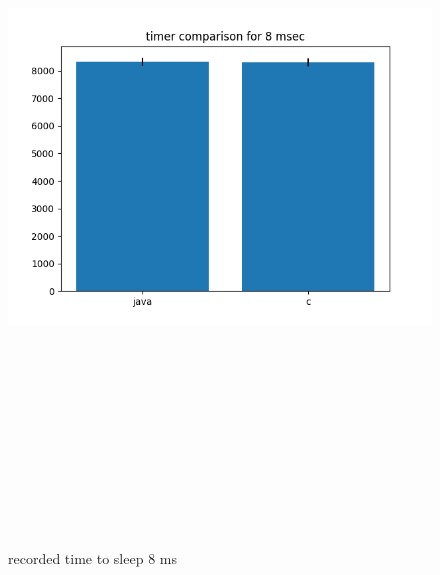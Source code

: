 \documentclass{article}
\begin{document}
    \begin{figure}[H]
    	\centering
    	\includegraphics[width=17cm,height=20cm,keepaspectratio]{AsyncMonitorCompares/sleep-timer_java-vs-c/time-compare-8.png}
    	\caption{recorded time to sleep 8 ms}
    	\label{fig:xalan-fix-PKG}
    \end{figure}
\end{document}

